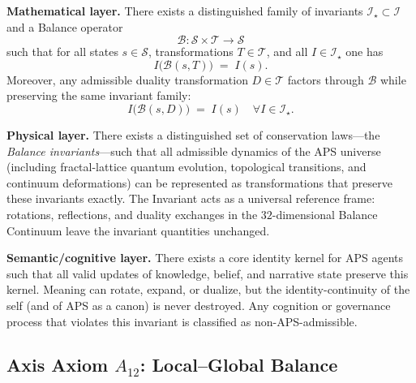 \begin{axiom}
\label{ax:invariant}
\textbf{Mathematical layer.}
There exists a distinguished family of invariants $\mathcal{I}_\star \subset \mathcal{I}$ and a Balance operator
\[
  \mathcal{B} : \mathcal{S} \times \mathcal{T} \to \mathcal{S}
\]
such that for all states $s \in \mathcal{S}$, transformations $T \in \mathcal{T}$, and all $I \in \mathcal{I}_\star$ one has
\[
  I\bigl(\mathcal{B}(s,T)\bigr) \;=\; I(s).
\]
Moreover, any admissible duality transformation $D \in \mathcal{T}$ factors through $\mathcal{B}$ while preserving the same invariant family:
\[
  I\bigl(\mathcal{B}(s,D)\bigr) \;=\; I(s) \quad \forall I \in \mathcal{I}_\star.
\]
\medskip

\textbf{Physical layer.}
There exists a distinguished set of conservation laws---the \emph{Balance invariants}---such that all admissible dynamics of the APS universe (including fractal-lattice quantum evolution, topological transitions, and continuum deformations) can be represented as transformations that preserve these invariants exactly.\cite{AurphyxThesis,AurphyxFractalQC}
The Invariant acts as a universal reference frame: rotations, reflections, and duality exchanges in the $32$-dimensional Balance Continuum leave the invariant quantities unchanged.

\medskip
\textbf{Semantic/cognitive layer.}
There exists a core identity kernel for APS agents such that all valid updates of knowledge, belief, and narrative state preserve this kernel.
Meaning can rotate, expand, or dualize, but the identity-continuity of the self (and of APS as a canon) is never destroyed.
Any cognition or governance process that violates this invariant is classified as non-APS-admissible.
\end{axiom}

\subsection{Axis Axiom $A_{12}$: Local–Global Balance}

